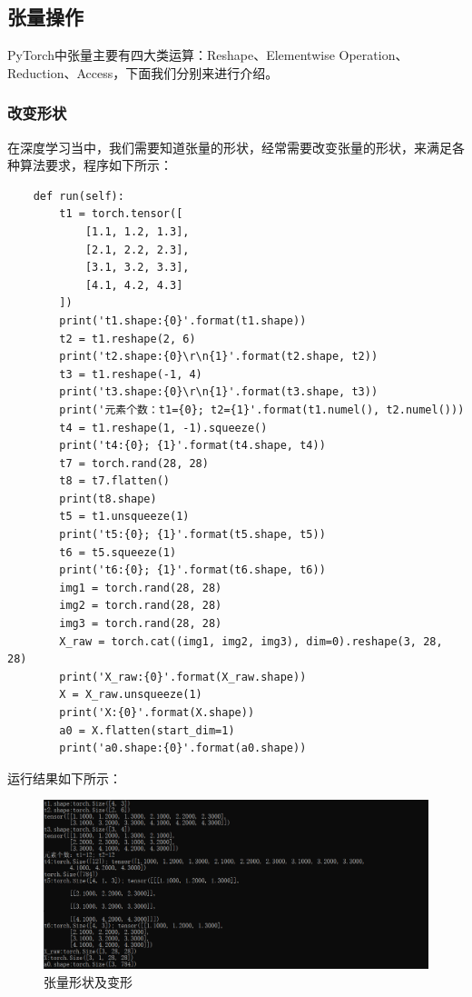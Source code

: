 \documentclass[UTF8]{article}
\begin{document}
\subsection{张量操作}
PyTorch中张量主要有四大类运算：Reshape、Elementwise Operation、Reduction、Access，下面我们分别来进行介绍。
\subsubsection{改变形状}
在深度学习当中，我们需要知道张量的形状，经常需要改变张量的形状，来满足各种算法要求，程序如下所示：
\begin{lstlisting}
    def run(self):
        t1 = torch.tensor([
            [1.1, 1.2, 1.3],
            [2.1, 2.2, 2.3],
            [3.1, 3.2, 3.3],
            [4.1, 4.2, 4.3]
        ])
        print('t1.shape:{0}'.format(t1.shape))
        t2 = t1.reshape(2, 6)
        print('t2.shape:{0}\r\n{1}'.format(t2.shape, t2))
        t3 = t1.reshape(-1, 4)
        print('t3.shape:{0}\r\n{1}'.format(t3.shape, t3))
        print('元素个数：t1={0}; t2={1}'.format(t1.numel(), t2.numel()))
        t4 = t1.reshape(1, -1).squeeze()
        print('t4:{0}; {1}'.format(t4.shape, t4))
        t7 = torch.rand(28, 28)
        t8 = t7.flatten()
        print(t8.shape)
        t5 = t1.unsqueeze(1)
        print('t5:{0}; {1}'.format(t5.shape, t5))
        t6 = t5.squeeze(1)
        print('t6:{0}; {1}'.format(t6.shape, t6))
        img1 = torch.rand(28, 28)
        img2 = torch.rand(28, 28)
        img3 = torch.rand(28, 28)
        X_raw = torch.cat((img1, img2, img3), dim=0).reshape(3, 28, 28)
        print('X_raw:{0}'.format(X_raw.shape))
        X = X_raw.unsqueeze(1)
        print('X:{0}'.format(X.shape))
        a0 = X.flatten(start_dim=1)
        print('a0.shape:{0}'.format(a0.shape))
\end{lstlisting}
运行结果如下所示：
\begin{figure}[H]
	\caption{张量形状及变形}
	\label{f000005}
	\centering
	\includegraphics[width=15cm]{images/f000005}
\end{figure}
\end{document}
